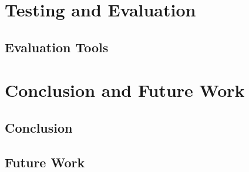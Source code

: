 \documentclass[USenglish]{ifimaster}
\begin{document}
\chapter{Testing and Evaluation}
\section{Evaluation Tools}

\chapter{Conclusion and Future Work}
\section{Conclusion}

\section{Future Work}

\pagebreak
\printbibliography{}
\printglossary
\end{document}
